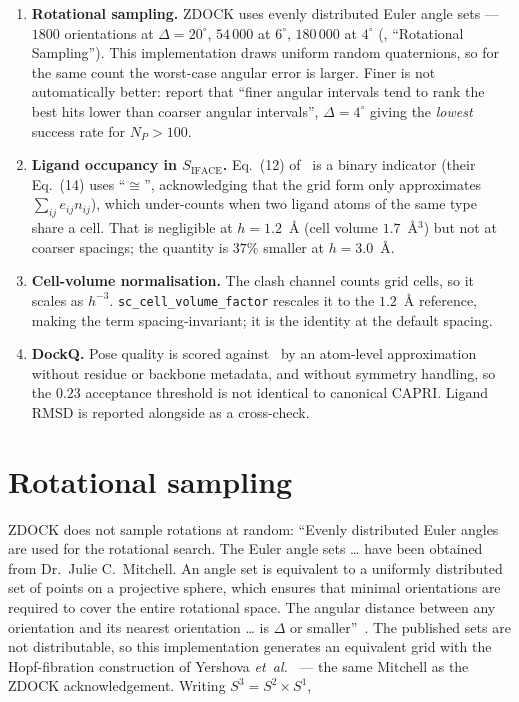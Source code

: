 \documentclass[11pt,a4paper]{article}
\newcommand{\Siface}{S_{\mathrm{IFACE}}}
\begin{document}
\begin{enumerate}
  \item \textbf{Rotational sampling.} ZDOCK uses evenly distributed Euler angle
    sets --- $1800$ orientations at $\Delta=20^\circ$, $54\,000$ at $6^\circ$,
    $180\,000$ at $4^\circ$ (\cite{ChenWeng2003psc}, ``Rotational Sampling'').
    This implementation draws uniform random quaternions, so for the same count
    the worst-case angular error is larger. Finer is not automatically better:
    \cite{ChenWeng2003psc} report that ``finer angular intervals tend to rank
    the best hits lower than coarser angular intervals'', $\Delta=4^\circ$
    giving the \emph{lowest} success rate for $N_P > 100$.
  \item \textbf{Ligand occupancy in $\Siface$.} Eq.~(12)
    of~\cite{Mintseris2007} is a binary indicator (their Eq.~(14) uses
    ``$\cong$'', acknowledging that the grid form only approximates
    $\sum_{ij}e_{ij}n_{ij}$), which under-counts when two
    ligand atoms of the same type share a cell. That is negligible at
    $h=1.2$~\AA{} (cell volume $1.7$~\AA$^3$) but not at coarser spacings; the
    quantity is $37\%$ smaller at $h=3.0$~\AA.
  \item \textbf{Cell-volume normalisation.} The clash channel counts grid
    cells, so it scales as $h^{-3}$. \texttt{sc\_cell\_volume\_factor}
    rescales it to the $1.2$~\AA{} reference, making the term
    spacing-invariant; it is the identity at the default spacing.
  \item \textbf{DockQ.} Pose quality is scored against~\cite{Basu2016dockq} by
    an atom-level approximation
    without residue or backbone metadata, and without symmetry handling, so
    the $0.23$ acceptance threshold is not identical to canonical CAPRI. Ligand
    RMSD is reported alongside as a cross-check.
\end{enumerate}

\section{Rotational sampling}

ZDOCK does not sample rotations at random: ``Evenly distributed Euler angles are
used for the rotational search. The Euler angle sets \ldots{} have been obtained
from Dr.\ Julie C.\ Mitchell. An angle set is equivalent to a uniformly
distributed set of points on a projective sphere, which ensures that minimal
orientations are required to cover the entire rotational space. The angular
distance between any orientation and its nearest orientation \ldots{} is
$\Delta$ or smaller''~\cite{ChenWeng2003psc}. The published sets are not
distributable, so this implementation generates an equivalent grid with the
Hopf-fibration construction of Yershova \emph{et~al.}~\cite{Yershova2010} ---
the same Mitchell as the ZDOCK acknowledgement. Writing $S^3 = S^2 \times S^1$,
\end{document}
